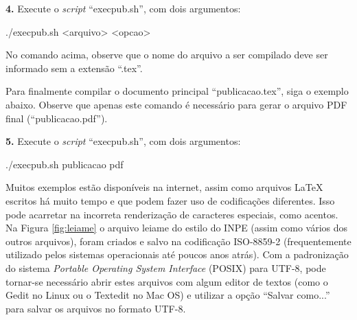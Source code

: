 \textbf{4.} Execute o \textit{script} ``execpub.sh'', com dois argumentos:
\begin{commandshell}
./execpub.sh <arquivo> <opcao>
\end{commandshell}

No comando acima, observe que o nome do arquivo a ser compilado deve ser informado sem a extensão ``.tex''.

Para finalmente compilar o documento principal ``publicacao.tex'', siga o exemplo abaixo. Observe que apenas este comando é necessário para gerar o arquivo PDF final (``publicacao.pdf'').

\textbf{5.} Execute o \textit{script} ``execpub.sh'', com dois argumentos:
\begin{commandshell}
./execpub.sh publicacao pdf
\end{commandshell}

Muitos exemplos estão disponíveis na internet, assim como arquivos \LaTeX{} escritos há muito tempo e que podem fazer uso de codificações diferentes. Isso pode acarretar na incorreta renderização de caracteres especiais, como acentos. Na Figura \ref{fig:leiame} o arquivo leiame do estilo do INPE (assim como vários dos outros arquivos), foram criados e salvo na codificação ISO-8859-2 (frequentemente utilizado pelos sistemas operacionais até poucos anos atrás). Com a padronização do sistema \textit{Portable Operating System Interface} (POSIX) para UTF-8, pode tornar-se necessário abrir estes arquivos com algum editor de textos (como o Gedit no Linux ou o Textedit no Mac OS) e utilizar a opção ``Salvar como...'' para salvar os arquivos no formato UTF-8. 

